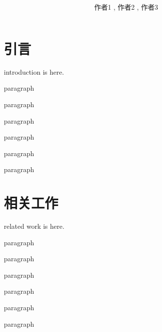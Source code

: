 \documentclass[twocolumn]{ctexart}
\begin{document}
	\everymath{\displaystyle}%
	\abovedisplayshortskip=5pt%
	\belowdisplayshortskip=5pt
	\abovedisplayskip=5pt
	\belowdisplayskip=5pt
	\lineskiplimit=4pt
	\lineskip=4pt
	\title{ }%
	\date{}%
	\author[1]{作者1 , 作者2 , 作者3\vspace{-1.5em}}%
	\twocolumn[
	\begin{@twocolumnfalse}
		\maketitle 
		\begin{abstract}
			\newgeometry{left=1.5cm, right=1.5cm}%
			\noindent{\zihao{-5}{\heiti 摘~~~要 }{\kaishu abstract is here。}}\\
			\noindent{\zihao{-5}\heiti 关键词 }~~~{\zihao{-5}\kaishu 关键词1~~~~关键词2~~~~关键词3}\\
			\\
		\end{abstract}
	\end{@twocolumnfalse}
	]%

	\section{引言}

	introduction is here.

	paragraph

	paragraph

	paragraph

	paragraph

	paragraph

	paragraph

	\section{相关工作}

	related work is here.

	paragraph

	paragraph

	paragraph

	paragraph

	paragraph

	paragraph
\end{document}
